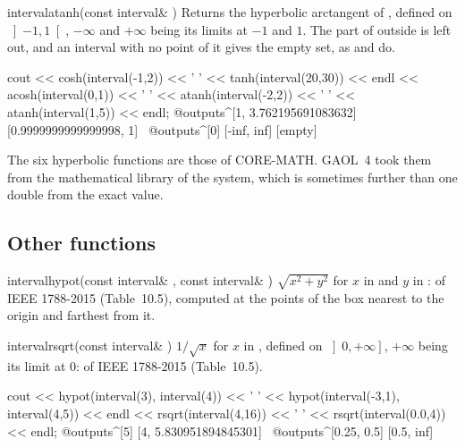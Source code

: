 \documentclass[12pt,a4paper,twoside,openright]{book}
\begin{document}
\begin{deffun}{interval}{atanh}{(const interval\& )}
  Returns the hyperbolic arctangent of , defined on
  $\left]-1,1\right[$, $-\infty$ and $+\infty$ being its limits at $-1$ and
  $1$. The part of  outside is left out, and an interval with no point
  of it gives the empty set, as  and
   do.
\begin{example}
cout << cosh(interval(-1,2)) << ' '
     << tanh(interval(20,30)) << endl
     << acosh(interval(0,1)) << ' '
     << atanh(interval(-2,2)) << ' '
     << atanh(interval(1,5)) << endl;
@outputs^[1, 3.762195691083632] [0.9999999999999998, 1]~
@outputs^[0] [-inf, inf] [empty]~
\end{example}
\end{deffun}

\begin{Rem}\label{rem:arithmetic-hyperbolic-coremath}
The six hyperbolic functions are those of CORE-MATH. GAOL~4 took them from
the mathematical library of the system, which is sometimes further than one
double from the exact value.\newinvfive
\end{Rem}

\subsection{Other functions}\label{sec:arithmetic-other}

\begin{deffun}{interval}{hypot}{(const interval\& , const interval\& )}
  $\sqrt{x^2+y^2}$ for $x$ in  and $y$ in :  of
  IEEE 1788-2015 (Table~10.5), computed at the points of the box nearest to
  the origin and farthest from it.\newinvfive
\end{deffun}

\begin{deffun}{interval}{rsqrt}{(const interval\& )}
  $1/\sqrt{x}$ for $x$ in , defined on $\left]0,+\infty\right]$,
  $+\infty$ being its limit at 0:  of IEEE 1788-2015
  (Table~10.5).\newinvfive
\begin{example}
cout << hypot(interval(3), interval(4)) << ' '
     << hypot(interval(-3,1), interval(4,5)) << endl
     << rsqrt(interval(4,16)) << ' '
     << rsqrt(interval(0.0,4)) << endl;
@outputs^[5] [4, 5.830951894845301]~
@outputs^[0.25, 0.5] [0.5, inf]~
\end{example}
\end{deffun}
\end{document}
